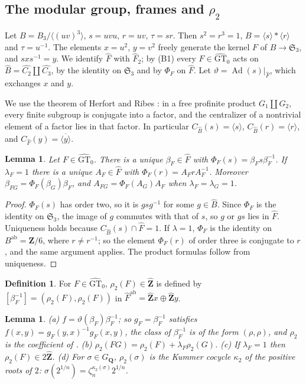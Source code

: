 \documentclass[11pt,a4paper]{article}
\theoremstyle{plain}
\newtheorem{lemma}[theorem]{Lemma}
\theoremstyle{definition}
\newtheorem{definition}[theorem]{Definition}
\theoremstyle{remark}
\newcommand{\GTz}{\widehat{\mathrm{GT}}_0}
\newcommand{\Zh}{\widehat{\mathbf Z}}
\newcommand{\Z}{\mathbf Z}
\newcommand{\GQ}{G_{\mathbf Q}}
\newcommand{\Fh}{\widehat F}
\newcommand{\Bh}{\widehat B}
\newcommand{\Ad}{\operatorname{Ad}}
\newcommand{\ab}{\mathrm{ab}}
\begin{document}
\subsection*{The modular group, frames and $\rho_2$}
Let $B=B_3/\langle(uv)^3\rangle$, $s=uvu$, $r=uv$, $\tau=sr$. Then $s^2=r^3=1$, $B=\langle s\rangle*\langle
r\rangle$ and $\tau=u^{-1}$. The elements $x=u^2$, $y=v^2$ freely generate the kernel $F$ of $B\to\mathfrak S_3$,
and $sxs^{-1}=y$. We identify $\Fh$ with $\Fh_2$; by (B1) every $F\in\GTz$ acts on
$\Bh=\widehat{C_2}\amalg\widehat{C_3}$, by the identity on $\mathfrak S_3$ and by $\Phi_F$ on $\Fh$. Let
$\vartheta=\Ad(s)|_{\Fh}$, which exchanges $x$ and $y$.

We use the theorem of Herfort and Ribes \cite{HR}: in a free profinite product $G_1\amalg G_2$, every finite
subgroup is conjugate into a factor, and the centralizer of a nontrivial element of a factor lies in that factor.
In particular $C_{\Bh}(s)=\langle s\rangle$, $C_{\Bh}(r)=\langle r\rangle$, and
$C_{\Fh}(y)=\overline{\langle y\rangle}$.

\begin{lemma}\label{lem:frames}
Let $F\in\GTz$. There is a unique $\beta_F\in\Fh$ with $\Phi_F(s)=\beta_Fs\beta_F^{-1}$. If $\lambda_F=1$ there is
a unique $A_F\in\Fh$ with $\Phi_F(r)=A_FrA_F^{-1}$. Moreover $\beta_{FG}=\Phi_F(\beta_G)\beta_F$, and
$A_{FG}=\Phi_F(A_G)A_F$ when $\lambda_F=\lambda_G=1$.
\end{lemma}

\begin{proof}
$\Phi_F(s)$ has order two, so it is $gsg^{-1}$ for some $g\in\Bh$. Since $\Phi_F$ is the identity on $\mathfrak
S_3$, the image of $g$ commutes with that of $s$, so $g$ or $gs$ lies in $\Fh$. Uniqueness holds because
$C_{\Bh}(s)\cap\Fh=1$. If $\lambda=1$, $\Phi_F$ is the identity on $B^{\ab}=\Z/6$, where $r\ne r^{-1}$; so the
element $\Phi_F(r)$ of order three is conjugate to $r$, and the same argument applies. The product formulas follow
from uniqueness.
\end{proof}

\begin{definition}\label{def:rho}
For $F\in\GTz$, $\rho_2(F)\in\Zh$ is defined by $[\beta_F^{-1}]=(\rho_2(F),\rho_2(F))$ in
$\Fh^{\ab}=\Zh x\oplus\Zh y$.
\end{definition}

\begin{lemma}\label{lem:rho}
\textup{(a)} $f=\vartheta(\beta_F)\beta_F^{-1}$; so $g_F=\beta_F^{-1}$ satisfies $f(x,y)=g_F(y,x)^{-1}g_F(x,y)$, the
class of $\beta_F^{-1}$ is of the form $(\rho,\rho)$, and $\rho_2$ is the coefficient of \cite[Definition 5.1]{NS}.
\textup{(b)} $\rho_2(FG)=\rho_2(F)+\lambda_F\rho_2(G)$.
\textup{(c)} If $\lambda_F=1$ then $\rho_2(F)\in2\Zh$.
\textup{(d)} For $\sigma\in\GQ$, $\rho_2(\sigma)$ is the Kummer cocycle $\kappa_2$ of the positive roots of $2$:
$\sigma(2^{1/n})=\zeta_n^{\kappa_2(\sigma)}2^{1/n}$.
\end{lemma}
\end{document}
